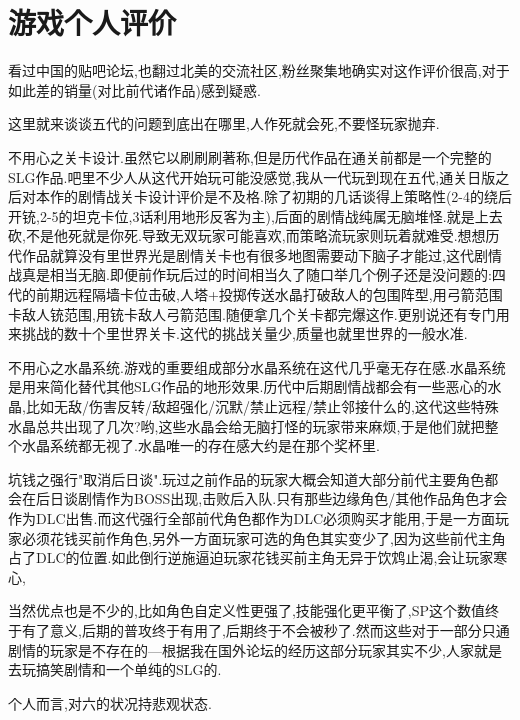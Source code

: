 \newpage
\section{游戏个人评价}

	看过中国的贴吧论坛,也翻过北美的交流社区,粉丝聚集地确实对这作评价很高,对于如此差的销量(对比前代诸作品)感到疑惑.

	这里就来谈谈五代的问题到底出在哪里,人作死就会死,不要怪玩家抛弃.

	不用心之关卡设计.虽然它以刷刷刷著称,但是历代作品在通关前都是一个完整的SLG作品.吧里不少人从这代开始玩可能没感觉,我从一代玩到现在五代,通关日版之后对本作的剧情战关卡设计评价是不及格.除了初期的几话谈得上策略性(2-4的绕后开铳,2-5的坦克卡位,3话利用地形反客为主),后面的剧情战纯属无脑堆怪.就是上去砍,不是他死就是你死.导致无双玩家可能喜欢,而策略流玩家则玩着就难受.想想历代作品就算没有里世界光是剧情关卡也有很多地图需要动下脑子才能过,这代剧情战真是相当无脑.即便前作玩后过的时间相当久了随口举几个例子还是没问题的:四代的前期远程隔墙卡位击破,人塔+投掷传送水晶打破敌人的包围阵型,用弓箭范围卡敌人铳范围,用铳卡敌人弓箭范围.随便拿几个关卡都完爆这作.更别说还有专门用来挑战的数十个里世界关卡.这代的挑战关量少,质量也就里世界的一般水准.

	不用心之水晶系统.游戏的重要组成部分水晶系统在这代几乎毫无存在感.水晶系统是用来简化替代其他SLG作品的地形效果.历代中后期剧情战都会有一些恶心的水晶,比如无敌/伤害反转/敌超强化/沉默/禁止远程/禁止邻接什么的,这代这些特殊水晶总共出现了几次?哟,这些水晶会给无脑打怪的玩家带来麻烦,于是他们就把整个水晶系统都无视了.水晶唯一的存在感大约是在那个奖杯里.

	坑钱之强行"取消后日谈".玩过之前作品的玩家大概会知道大部分前代主要角色都会在后日谈剧情作为BOSS出现,击败后入队.只有那些边缘角色/其他作品角色才会作为DLC出售.而这代强行全部前代角色都作为DLC必须购买才能用,于是一方面玩家必须花钱买前作角色,另外一方面玩家可选的角色其实变少了,因为这些前代主角占了DLC的位置.如此倒行逆施逼迫玩家花钱买前主角无异于饮鸩止渴,会让玩家寒心,

	当然优点也是不少的,比如角色自定义性更强了,技能强化更平衡了,SP这个数值终于有了意义,后期的普攻终于有用了,后期终于不会被秒了.然而这些对于一部分只通剧情的玩家是不存在的---根据我在国外论坛的经历这部分玩家其实不少,人家就是去玩搞笑剧情和一个单纯的SLG的.

	个人而言,对六的状况持悲观状态.
